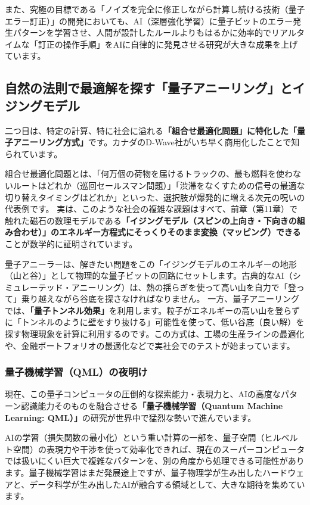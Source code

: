 また、究極の目標である「ノイズを完全に修正しながら計算し続ける技術（量子エラー訂正）」の開発においても、AI（深層強化学習）に量子ビットのエラー発生パターンを学習させ、人間が設計したルールよりもはるかに効率的でリアルタイムな「訂正の操作手順」をAIに自律的に発見させる研究が大きな成果を上げています。

\subsection{自然の法則で最適解を探す「量子アニーリング」とイジングモデル}

二つ目は、特定の計算、特に社会に溢れる\textbf{「組合せ最適化問題」に特化した「量子アニーリング方式」}です。カナダのD-Wave社がいち早く商用化したことで知られています。

組合せ最適化問題とは、「何万個の荷物を届けるトラックの、最も燃料を使わないルートはどれか（巡回セールスマン問題）」「渋滞をなくすための信号の最適な切り替えタイミングはどれか」といった、選択肢が爆発的に増える次元の呪いの代表例です。 実は、このような社会の複雑な課題はすべて、前章（第11章）で触れた磁石の数理モデルである\textbf{「イジングモデル（スピンの上向き・下向きの組み合わせ）」のエネルギー方程式にそっくりそのまま変換（マッピング）できる}ことが数学的に証明されています。

量子アニーラーは、解きたい問題をこの「イジングモデルのエネルギーの地形（山と谷）」として物理的な量子ビットの回路にセットします。古典的なAI（シミュレーテッド・アニーリング）は、熱の揺らぎを使って高い山を自力で「登って」乗り越えながら谷底を探さなければなりません。 一方、量子アニーリングでは、\textbf{「量子トンネル効果」}を利用します。粒子がエネルギーの高い山を登らずに「トンネルのように壁をすり抜ける」可能性を使って、低い谷底（良い解）を探す物理現象を計算に利用するのです。この方式は、工場の生産ラインの最適化や、金融ポートフォリオの最適化などで実社会でのテストが始まっています。

\subsubsection{量子機械学習（QML）の夜明け}

現在、この量子コンピュータの圧倒的な探索能力・表現力と、AIの高度なパターン認識能力そのものを融合させる\textbf{「量子機械学習（Quantum Machine Learning: QML）」}の研究が世界中で猛烈な勢いで進んでいます。

AIの学習（損失関数の最小化）という重い計算の一部を、量子空間（ヒルベルト空間）の表現力や干渉を使って効率化できれば、現在のスーパーコンピュータでは扱いにくい巨大で複雑なパターンを、別の角度から処理できる可能性があります。量子機械学習はまだ発展途上ですが、量子物理学が生み出したハードウェアと、データ科学が生み出したAIが融合する領域として、大きな期待を集めています。

